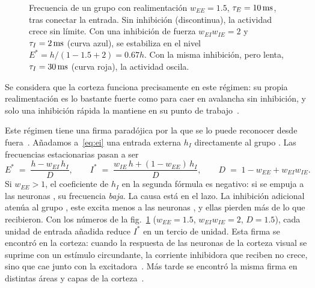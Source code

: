 \begin{figure}[t]
\centering
{}
\caption{Frecuencia de un grupo  con realimentación $w_{EE}=1.5$, $\tau_E=10\,\text{ms}$, tras conectar la entrada. Sin inhibición (discontinua), la actividad crece sin límite. Con una inhibición de fuerza $w_{EI}w_{IE}=2$ y $\tau_I=2\,\text{ms}$ (curva azul), se estabiliza en el nivel $E^*=h/(1-1.5+2)=0.67h$. Con la misma inhibición, pero lenta, $\tau_I=30\,\text{ms}$ (curva roja), la actividad oscila.}
\label{fig:ei}
\end{figure}

Se considera que la corteza funciona precisamente en este régimen: su propia realimentación es lo bastante fuerte como para caer en avalancha sin inhibición, y solo una inhibición rápida la mantiene en su punto de trabajo~\cite{Tsodyks1997isn}.

Este régimen tiene una firma paradójica por la que se lo puede reconocer desde fuera~\cite{Tsodyks1997isn}. Añadamos a~\eqref{eq:ei} una entrada externa $h_I$ directamente al grupo . Las frecuencias estacionarias pasan a ser
\begin{equation}
E^* \;=\; \frac{h-w_{EI}\,h_I}{D},\qquad
I^* \;=\; \frac{w_{IE}\,h+(1-w_{EE})\,h_I}{D},\qquad
D \;=\; 1-w_{EE}+w_{EI}w_{IE} .
\label{eq:isn}
\end{equation}
Si $w_{EE}>1$, el coeficiente de $h_I$ en la segunda fórmula es negativo: si se empuja a las neuronas , su frecuencia \emph{baja}. La causa está en el lazo. La inhibición adicional atenúa al grupo , este excita menos a las neuronas , y ellas pierden más de lo que recibieron. Con los números de la fig.~\ref{fig:ei} ($w_{EE}=1.5$, $w_{EI}w_{IE}=2$, $D=1.5$), cada unidad de entrada añadida reduce $I^*$ en un tercio de unidad. Esta firma se encontró en la corteza: cuando la respuesta de las neuronas de la corteza visual se suprime con un estímulo circundante, la corriente inhibidora que reciben no crece, sino que cae junto con la excitadora~\cite{Ozeki2009}. Más tarde se encontró la misma firma en distintas áreas y capas de la corteza~\cite{Sanzeni2020}.


